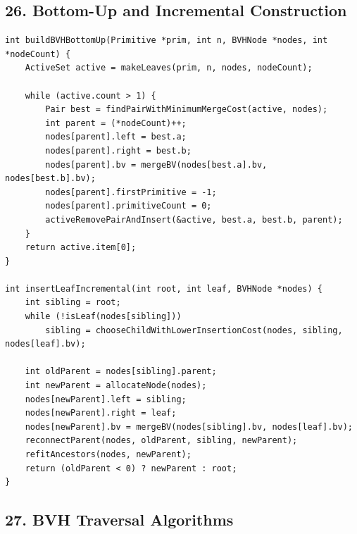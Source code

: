 \documentclass[10pt,letterpaper]{article}
\begin{document}
\subsection*{26. Bottom-Up and Incremental Construction}

\begin{verbatim}
int buildBVHBottomUp(Primitive *prim, int n, BVHNode *nodes, int *nodeCount) {
    ActiveSet active = makeLeaves(prim, n, nodes, nodeCount);

    while (active.count > 1) {
        Pair best = findPairWithMinimumMergeCost(active, nodes);
        int parent = (*nodeCount)++;
        nodes[parent].left = best.a;
        nodes[parent].right = best.b;
        nodes[parent].bv = mergeBV(nodes[best.a].bv, nodes[best.b].bv);
        nodes[parent].firstPrimitive = -1;
        nodes[parent].primitiveCount = 0;
        activeRemovePairAndInsert(&active, best.a, best.b, parent);
    }
    return active.item[0];
}

int insertLeafIncremental(int root, int leaf, BVHNode *nodes) {
    int sibling = root;
    while (!isLeaf(nodes[sibling]))
        sibling = chooseChildWithLowerInsertionCost(nodes, sibling, nodes[leaf].bv);

    int oldParent = nodes[sibling].parent;
    int newParent = allocateNode(nodes);
    nodes[newParent].left = sibling;
    nodes[newParent].right = leaf;
    nodes[newParent].bv = mergeBV(nodes[sibling].bv, nodes[leaf].bv);
    reconnectParent(nodes, oldParent, sibling, newParent);
    refitAncestors(nodes, newParent);
    return (oldParent < 0) ? newParent : root;
}
\end{verbatim}


\subsection*{27. BVH Traversal Algorithms}
\end{document}
